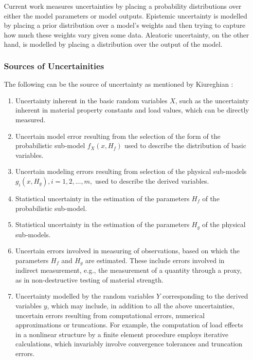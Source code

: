 Current work measures uncertainties  by placing a probability distributions over either the model parameters or model outputs. Epistemic uncertainty is modelled by placing a prior distribution over a model's weights and then trying to capture how much these weights vary given some data. Aleatoric uncertainty, on the other hand, is modelled by placing a distribution over the output of the model.

\subsubsection{Sources of Uncertainities}

The following can be the source of uncertainty as mentioned by Kiureghian \cite{Kiureghian}:

\begin{enumerate}
    \item Uncertainty inherent in the basic random variables $X$, such as the uncertainty inherent in material property constants and load values, which can be directly measured.
    \item Uncertain model error resulting from the selection of the form of the probabilistic sub-model $f_{X}(x,H_{f})$ used to describe the distribution of basic variables.
    \item  Uncertain modeling errors resulting from selection of the physical sub-models $g_{i}(x,H_{g}), i = 1,2,...,m,$ used to describe the derived variables.
    \item  Statistical uncertainty in the estimation of the parameters $H_f$ of the probabilistic sub-model.
    \item  Statistical uncertainty in the estimation of the parameters $H_g$ of the physical sub-models.
    \item  Uncertain errors involved in measuring of observations, based on which the parameters $H_f$ and $H_g$  are estimated. These include errors involved in indirect measurement, e.g., the measurement of a quantity through a proxy, as in non-destructive testing of material strength.
    \item Uncertainty modelled by the random variables $Y$ corresponding to the derived variables $y$, which may include, in addition to all the above uncertainties, uncertain errors resulting from computational errors, numerical approximations or truncations. For example, the computation of load effects in a nonlinear structure by a finite element procedure employs iterative calculations, which invariably involve convergence tolerances and truncation errors.
\end{enumerate} 

